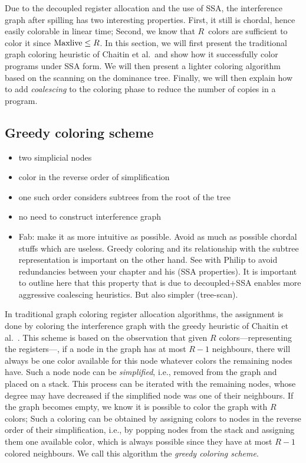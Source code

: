 {Due to the decoupled register allocation and the use of SSA, the interference graph after spilling has two interesting properties.
First, it still is chordal, hence easily colorable in linear time;
Second, we know that $R$~colors are sufficient to color it since $\mathrm{Maxlive} \leq R$.
In this section, we will first present the traditional graph coloring heuristic of Chaitin et al.\ and show how it successfully color programs under SSA form.
We will then present a lighter coloring algorithm based on the scanning on the dominance tree.
Finally, we will then explain how to add \emph{coalescing} to the coloring phase to reduce the number of copies in a program.

 

\subsection{Greedy coloring scheme}
\label{sec:regalloc:greedy-col}

{\sl
\begin{itemize}
  \item two simplicial nodes
  \item color in the reverse order of simplification
  \item one such order considers subtrees from the root of the tree
  \item no need to construct interference graph
  \item Fab: make it as more intuitive as possible. Avoid as much as possible 
    chordal stuffs which are useless. Greedy coloring and its relationship with 
    the subtree representation is important on the other hand. See with Philip 
    to avoid redundancies between your chapter and his (SSA properties). It is 
    important to outline here that this property that is due to decoupled+SSA 
    enables more aggressive coalescing heuristics. But also simpler 
    (tree-scan).
\end{itemize}
}


In traditional graph coloring register allocation algorithms, the assignment is done by coloring the interference graph with the greedy heuristic of Chaitin et al.~\cite{chaitin:1981:register}.
This scheme is based on the observation that given $R$ colors---representing the registers---, if a node in the graph has at most $R-1$ neighbours, there will always be one color available for this node whatever colors the remaining nodes have.
Such a node node can be \emph{simplified}, i.e., removed from the graph and placed on a stack.
This process can be iterated with the remaining nodes, whose degree may have decreased if the simplified node was one of their neighbours.
If the graph becomes empty, we know it is possible to color the graph with $R$ colors; 
Such a coloring can be obtained by assigning colors to nodes in the reverse order of their simplification, i.e., by popping nodes from the stack and assigning them one available color, which is always possible since they have at most $R-1$ colored neighbours.
We call this algorithm the \emph{greedy coloring scheme}.

}
